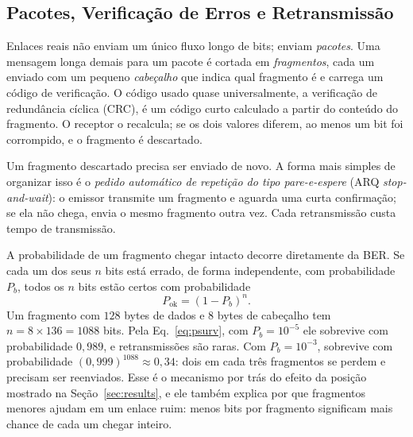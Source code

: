 

\subsection{Pacotes, Verificação de Erros e Retransmissão}\label{sec:fund-arq}
Enlaces reais não enviam um único fluxo longo de bits; enviam \emph{pacotes}.
Uma mensagem longa demais para um pacote é cortada em \emph{fragmentos}, cada
um enviado com um pequeno \emph{cabeçalho} que indica qual fragmento é e
carrega um código de verificação. O código usado quase universalmente, a
verificação de redundância cíclica (CRC), é um código curto calculado a partir
do conteúdo do fragmento. O receptor o recalcula; se os dois valores diferem,
ao menos um bit foi corrompido, e o fragmento é descartado.

Um fragmento descartado precisa ser enviado de novo. A forma mais simples de
organizar isso é o \emph{pedido automático de repetição do tipo
pare-e-espere} (ARQ \emph{stop-and-wait}): o emissor transmite um fragmento e
aguarda uma curta confirmação; se ela não chega, envia o mesmo fragmento outra
vez. Cada retransmissão custa tempo de transmissão.

A probabilidade de um fragmento chegar intacto decorre diretamente da BER. Se
cada um dos seus $n$ bits está errado, de forma independente, com probabilidade
$P_b$, todos os $n$ bits estão certos com
probabilidade~\cite{bertsekas1992data}
\begin{equation}
P_{\mathrm{ok}} = (1-P_b)^{n}.
\label{eq:psurv}
\end{equation}
Um fragmento com $128$ bytes de dados e $8$ bytes de cabeçalho tem
$n = 8\times136 = 1088$ bits. Pela Eq.~\eqref{eq:psurv}, com $P_b=10^{-5}$ ele
sobrevive com probabilidade $0{,}989$, e retransmissões são raras. Com
$P_b=10^{-3}$, sobrevive com probabilidade $(0{,}999)^{1088}\approx0{,}34$:
dois em cada três fragmentos se perdem e precisam ser reenviados. Esse é o
mecanismo por trás do efeito da posição mostrado na Seção~\ref{sec:results}, e
ele também explica por que fragmentos menores ajudam em um enlace ruim: menos
bits por fragmento significam mais chance de cada um chegar inteiro.
